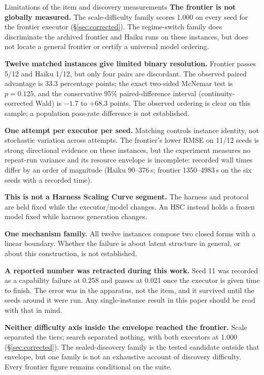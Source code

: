 \documentclass[11pt]{article}
\theoremstyle{definition}
\begin{document}
\begin{cautionbox}{Limitations of the item and discovery measurements}
\textbf{The frontier is not globally measured.} The scale-difficulty family scores 1.000 on every seed for the frontier executor (\S\ref{sec:corrected}). The regime-switch family does discriminate the archived frontier and Haiku runs on these instances, but does not locate a general frontier or certify a universal model ordering.

\textbf{Twelve matched instances give limited binary resolution.} Frontier passes 5/12 and Haiku 1/12, but only four pairs are discordant. The observed paired advantage is 33.3 percentage points; the exact two-sided McNemar test is $p=0.125$, and the conservative 95\% paired-difference interval (continuity-corrected Wald) is $-1.7$ to $+68.3$ points. The observed ordering is clear on this sample; a population pass-rate difference is not established.

\textbf{One attempt per executor per seed.} Matching controls instance identity, not stochastic variation across attempts. The frontier's lower RMSE on 11/12 seeds is strong directional evidence on these instances, but the experiment measures no repeat-run variance and its resource envelope is incomplete: recorded wall times differ by an order of magnitude (Haiku 90--376\,s; frontier 1350--4983\,s on the six seeds with a recorded time).

\textbf{This is not a Harness Scaling Curve segment.} The harness and protocol are held fixed while the executor/model changes. An HSC instead holds a frozen model fixed while harness generation changes.

\textbf{One mechanism family.} All twelve instances compose two closed forms with a linear boundary. Whether the failure is about latent structure in general, or about this construction, is not established.

\textbf{A reported number was retracted during this work.} Seed 11 was recorded as a capability failure at 0.258 and passes at 0.021 once the executor is given time to finish. The error was in the apparatus, not the item, and it survived until the seeds around it were run. Any single-instance result in this paper should be read with that in mind.

\textbf{Neither difficulty axis inside the envelope reached the frontier.} Scale separated the tiers; search separated nothing, with both executors at 1.000 (\S\ref{sec:corrected}). The sealed-discovery family is the tested candidate outside that envelope, but one family is not an exhaustive account of discovery difficulty. Every frontier figure remains conditional on the suite.


\end{cautionbox}
\end{document}
